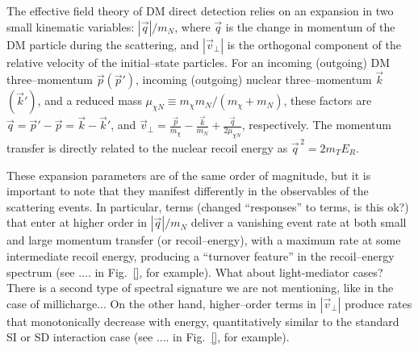 \documentclass[11pt]{article}
\newcommand{\Eq}[1]{Eq.~(\ref{#1})} \newcommand{\Eqs}[2]{Eqs.~(\ref{#1}) and (\ref{#2})} \newcommand{\Eqm}[2]{Eqs.~(\ref{#1}) through (\ref{#2})}
\newcommand{\vgColor}{magenta}
\newcommand{\vg}[1]{{\color{\vgColor} #1}}
\begin{document}


The effective field theory of DM direct detection \cite{Fitzpatrick:2012ix, Anand:2013yka} relies on an expansion in two small kinematic variables: $|\vec q|/m_N$, where $\vec q$ is the change in momentum of the DM particle during the scattering, and $|\vec v_\perp|$ is the orthogonal component of the relative velocity of the initial--state particles. For an incoming (outgoing) DM three--momentum $\vec p(\vec p')$, incoming (outgoing) nuclear three--momentum $\vec k$ $(\vec k')$, and a reduced mass $\mu_{\chi N} \equiv m_\chi m_N/(m_\chi +m_N)$, these factors are $\vec q=\vec p'-\vec p=\vec k-\vec k'$, and $\vec v_\perp=\frac{\vec p}{m_\chi}-\frac{\vec k}{m_N}+\frac{\vec q}{2\mu_{\chi N}}$, respectively.
The momentum transfer is directly related to the nuclear recoil energy as $\vec{q}^{\, 2} =2m_TE_R$. 

These expansion parameters are of the same order of magnitude, but it is important to note that they manifest differently in the observables of the scattering events. In particular, terms \vg{(changed ``responses'' to terms, is this ok?)} that enter at higher order in $|\vec q|/m_N$ deliver a vanishing event rate at both small and large momentum transfer (or recoil--energy), with a maximum rate at some intermediate recoil energy, producing a ``turnover feature'' in the recoil--energy spectrum (see .... in Fig.~\ref{}, for example). \vg{What about light-mediator cases? There is a second type of spectral signature we are not mentioning, like in the case of millicharge...} On the other hand, higher--order terms in $| \vec v_\perp|$ produce rates that monotonically decrease with energy, quantitatively similar to the standard SI or SD interaction case (see .... in Fig.~\ref{}, for example). 
\end{document}
